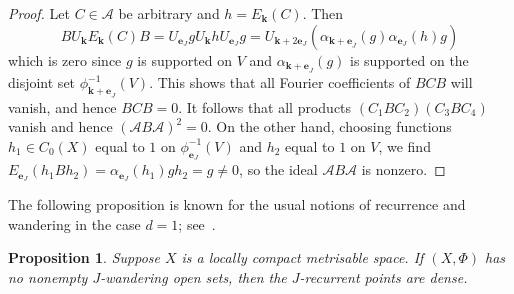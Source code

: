 \documentclass[12pt]{amsart}
\newtheorem{proposition}[theorem]{Proposition}
\theoremstyle{definition}
\newcommand{\bo}[1]{\mathbf{#1}}
\begin{document}
\begin{proof} Let $C\in\mathcal{A}$ be arbitrary and
$h = E_{\bo{k}}(C)$.
Then
\[ BU_{\bo{k}} E_{\bo{k}}(C)B
  = U_{\bo{e}_J} g U_\bo{k} h U_{\bo{e}_J}g
  = U_{\bo{k+}2\bo{e}_J}
    (\alpha_{\bo{k+e}_J}(g) \alpha_{\bo{e}_J}(h)g)
\]
which is zero since $g$ is supported on $V$ and
$\alpha_{\bo{k+e}_J}(g)$ is supported on the disjoint set
$\phi_{\bo{k+e}_J}^{-1}(V)$.
This shows that all Fourier coefficients of $BCB$ will vanish,
and hence $BCB=0$.
It follows that all products $(C_1BC_2)(C_3BC_{4})$ vanish and hence
$(\mathcal{A}B\mathcal{A})^{2}=0$. On the other hand, choosing
functions $h_1\in C_{0}(X)$ equal to $1$ on
$\phi_{\bo{e}_J}^{-1}(V)$ and $h_2$ equal to $1$ on $V$, we find
$E_{\bo{e}_J}(h_1Bh_2)=\alpha_{\bo{e}_J}(h_1) g h_2=g\neq 0$, so
the ideal $\mathcal{A}B\mathcal{A}$ is nonzero.
\end{proof}

The following proposition is known for the usual notions of
recurrence and wandering in the case $d=1$;
see~\cite[Theorem~1.27]{Furstenberg81}.

\begin{proposition}
\label{wandrec} Suppose $X$ is a locally compact metrisable space.
If $(X,\Phi)$ has no nonempty $J$-wandering open
sets, then the $J$-recurrent points are dense.
\end{proposition}
\end{document}
